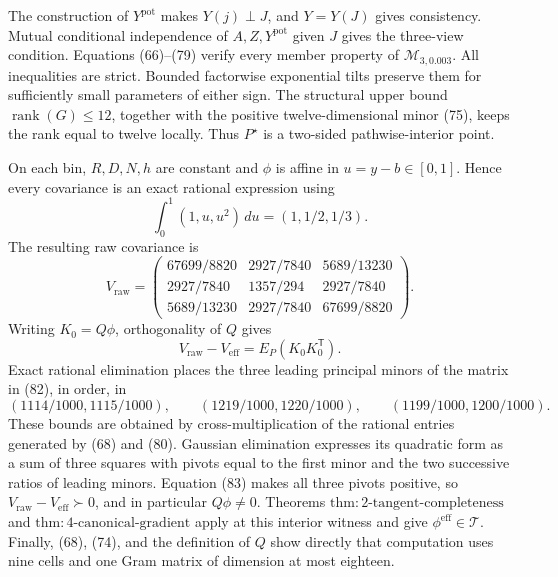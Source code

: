 The construction of \(Y^{\mathrm{pot}}\) makes \(Y(j)\perp J\), and \(Y=Y(J)\) gives consistency.  Mutual conditional independence of \(A,Z,Y^{\mathrm{pot}}\) given \(J\) gives the three-view condition.  Equations (66)--(79) verify every member property of \(\mathcal M_{3,0.003}\).  All inequalities are strict.  Bounded factorwise exponential tilts preserve them for sufficiently small parameters of either sign.  The structural upper bound \(\operatorname{rank}(G)\leq12\), together with the positive twelve-dimensional minor (75), keeps the rank equal to twelve locally.  Thus \(P^\star\) is a two-sided pathwise-interior point.

On each bin, \(R,D,N,h\) are constant and \(\phi\) is affine in \(u=y-b\in[0,1]\).  Hence every covariance is an exact rational expression using
\[
 \int_0^1(1,u,u^2)\,du=(1,1/2,1/3). \tag{80}
\]
The resulting raw covariance is
\[
 V_{\mathrm{raw}}=
 \begin{pmatrix}
 67699/8820&2927/7840&5689/13230\\
 2927/7840&1357/294&2927/7840\\
 5689/13230&2927/7840&67699/8820
 \end{pmatrix}. \tag{81}
\]
Writing \(K_0=Q\phi\), orthogonality of \(Q\) gives
\[
 V_{\mathrm{raw}}-V_{\mathrm{eff}}=E_P(K_0K_0^{\mathsf T}). \tag{82}
\]
Exact rational elimination places the three leading principal minors of the matrix in (82), in order, in
\[
 (1114/1000,1115/1000),\qquad
 (1219/1000,1220/1000),\qquad
 (1199/1000,1200/1000). \tag{83}
\]
These bounds are obtained by cross-multiplication of the rational entries generated by (68) and (80).  Gaussian elimination expresses its quadratic form as a sum of three squares with pivots equal to the first minor and the two successive ratios of leading minors.  Equation (83) makes all three pivots positive, so \(V_{\mathrm{raw}}-V_{\mathrm{eff}}\succ0\), and in particular \(Q\phi\ne0\).  Theorems \(\mathrm{thm{:}2\mbox{-}tangent\mbox{-}completeness}\) and \(\mathrm{thm{:}4\mbox{-}canonical\mbox{-}gradient}\) apply at this interior witness and give \(\phi^{\mathrm{eff}}\in\mathcal T\).  Finally, (68), (74), and the definition of \(Q\) show directly that computation uses nine cells and one Gram matrix of dimension at most eighteen.

